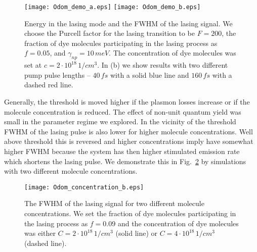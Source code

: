 \documentclass{iopart}
\begin{document}
\begin{figure} %
\texttt{[image: Odom\_demo\_a.eps]}
\texttt{[image: Odom\_demo\_b.eps]}
\caption[Fig5]{Energy in the lasing mode and the FWHM of the lasing signal.
We choose the Purcell factor for the lasing transition to be $F=200$, the fraction of dye molecules
participating in the lasing process as $f=0.05$, and $\gamma_{np}=10\, meV$.
The concentration of dye molecules was set at $c=2\cdot 10^{18}\, 1/cm^3$.
In (b) we show results with two different pump pulse lengths -- $40\, fs$ with a solid blue line
and $160\, fs$ with a dashed red line.}
\label{fig:demosimu}
\end{figure} 


Generally, the threshold is moved higher if the plasmon losses increase or 
if the molecule concentration is reduced. The effect of non-unit
quantum yield was small in the parameter regime we explored.
In the vicinity of the threshold FWHM of the lasing pulse is also lower for higher molecule concentrations.
Well above threshold this is reversed and higher concentrations imply 
have somewhat higher FWHM because the system has then higher stimulated
emission rate which shortens the lasing pulse. We demonstrate this in 
Fig.~\ref{fig:demosimu_2concentrations} by simulations with two different molecule concentrations.
\begin{figure} %
\texttt{[image: Odom\_concentration\_b.eps]}
\caption[Fig6]{The FWHM of the lasing signal for two different molecule
concentrations.
We set the fraction of dye molecules
participating in the lasing process as $f=0.09$ and the
concentration of dye molecules was either $C=2\cdot 10^{18}\, 1/cm^3$ (solid line)
or $C=4\cdot 10^{18}\, 1/cm^3$ (dashed line).
}
\label{fig:demosimu_2concentrations}
\end{figure} 



\end{document}
